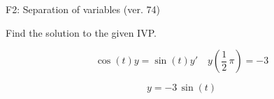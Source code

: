 \begin{exercise}
  \begin{exerciseTitle}F2: Separation of variables (ver. 74)\end{exerciseTitle}
  \begin{exerciseStatement}
    
Find the solution to the given IVP.

    
\[\cos\left(t\right) y= \sin\left(t\right) y'\hspace{1em} y\left( \frac{1}{2} \, \pi \right)= -3\]

  \end{exerciseStatement}
  \begin{exerciseAnswer}
    
\[y= -3 \, \sin\left(t\right)\]

  \end{exerciseAnswer}
\end{exercise}